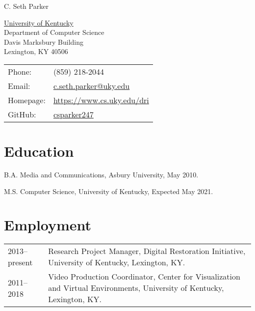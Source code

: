 \documentclass[letterpaper]{article}
\def\name{C. Seth Parker}
\renewenvironment{itemize}{
  \begin{list}{}{
    \setlength{\leftmargin}{1.5em}
  }
}{
  \end{list}
}
\begin{document}
{\huge \name}


\vspace{0.25in}

\begin{minipage}{0.45\linewidth}
  \href{http://www.uky.edu/}{University of Kentucky} \\
  Department of Computer Science \\
  Davis Marksbury Building \\
  Lexington, KY 40506
\end{minipage}
\begin{minipage}{0.45\linewidth}
  \begin{tabular}{ll}
    Phone: & (859) 218-2044 \\
    Email: & \href{mailto:c.seth.parker@uky.edu}{c.seth.parker@uky.edu} \\
    Homepage: & \href{https://www.cs.uky.edu/dri}{https://www.cs.uky.edu/dri} \\
    GitHub: & \href{https://www.github.com/csparker247}{csparker247} \\
  \end{tabular}
\end{minipage}


%


\section*{Education}

\begin{itemize}
  \item B.A. Media and Communications, Asbury University, May 2010.

  \item M.S. Computer Science, University of Kentucky, Expected May 2021.
\end{itemize}


\section*{Employment}
\renewcommand{\arraystretch}{1.5}
\begin{tabularx}{\linewidth}{lX}
  2013--present & Research Project Manager, Digital Restoration Initiative, University of Kentucky, Lexington, KY. \\
  2011--2018 & Video Production Coordinator, Center for Visualization and Virtual Environments, University of Kentucky, Lexington, KY. \\
\end{tabularx}
\end{document}
